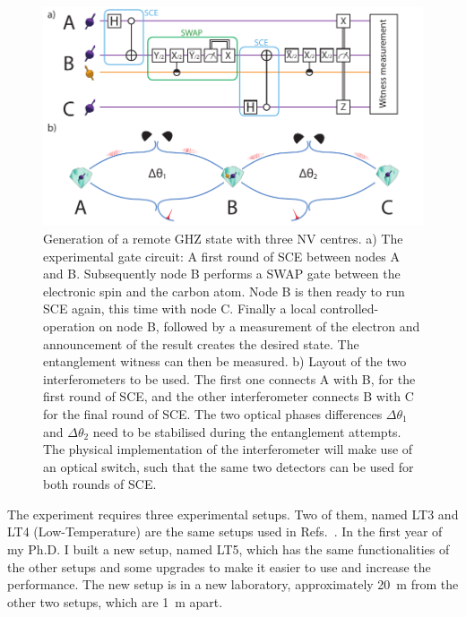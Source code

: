 \documentclass[a4paper]{article}
\begin{document}
\begin{figure}[h]
	\centering
	\includegraphics[width=\textwidth]{images/figure3}
	\caption{
		Generation of a remote GHZ state with three \ac{NV} centres.
		a) The experimental gate circuit: A first round of \acf{SCE} between nodes A and B. Subsequently node B performs a \textsc{SWAP} gate between the electronic spin and the carbon atom. Node B is then ready to run \ac{SCE} again, this time with node C. Finally a local controlled-operation on node B, followed by a measurement of the electron and announcement of the result creates the desired state. The entanglement witness can then be measured.
		b) Layout of the two interferometers to be used. The first one connects A with B, for the first round of \ac{SCE}, and the other interferometer connects B with C for the final round of \ac{SCE}. The two optical phases differences $\Delta\theta_1$ and $\Delta\theta_2$ need to be stabilised during the entanglement attempts. The physical implementation of the interferometer will make use of an optical switch, such that the same two detectors can be used for both rounds of \ac{SCE}.
	}
	\label{fig:3node_scheme}
\end{figure}

The experiment requires three experimental setups. Two of them, named LT3 and LT4 (Low-Temperature) are the same setups used in Refs.~\cite{Kalb2017, Humphreys2018}.
In the first year of my Ph.D. I built a new setup, named LT5, which has the same functionalities of the other setups and some upgrades to make it easier to use and increase the performance. The new setup is in a new laboratory, approximately \SI{20}{m} from the other two setups, which are \SI{1}{m} apart.
\end{document}
